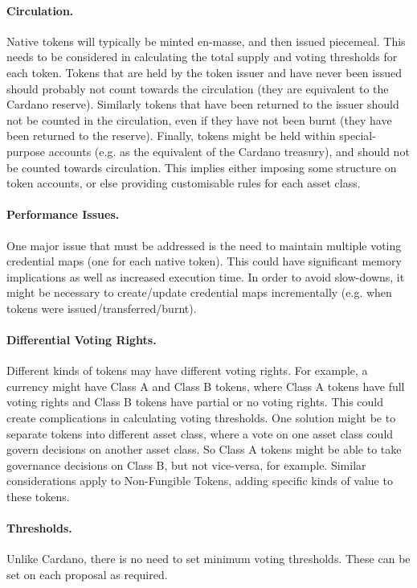\paragraph{Circulation.}
Native tokens will typically be minted en-masse, and then issued piecemeal.
This needs to be considered in calculating the total supply and voting
thresholds for each token.  Tokens that are held by the token issuer and have
never been issued should probably not count towards the circulation (they are
equivalent to the Cardano reserve).  Similarly tokens that have been returned to
the issuer should not be counted in the circulation, even if they have not been
burnt (they have been returned to the reserve).  Finally, tokens might be held
within special-purpose accounts (e.g. as the equivalent of the Cardano
treasury), and should not be counted towards circulation.  This implies either
imposing some structure on token accounts, or else providing customisable rules for
each asset class.

\paragraph{Performance Issues.}
One major issue that must be addressed is the need to maintain multiple voting
credential maps (one for each native token).  This could have significant memory
implications as well as increased execution time.  In order to avoid slow-downs,
it might be necessary to create/update credential maps incrementally (e.g. when
tokens were issued/transferred/burnt).

\paragraph{Differential  Voting Rights.}
Different kinds of tokens may have different voting rights.  For example, a
currency might have Class A and Class B tokens, where Class A tokens have full
voting rights and Class B tokens have partial or no voting rights.  This could
create complications in calculating voting thresholds.  One solution might be to
separate tokens into different asset class, where a vote on one asset class
could govern decisions on another asset class.  So Class A tokens might be able
to take governance decisions on Class B, but not vice-versa, for example.
Similar considerations apply to Non-Fungible Tokens, adding specific kinds of
value to these tokens.

\paragraph{Thresholds.}
Unlike Cardano, there is no need to set minimum voting thresholds.  These can be
set on each proposal as required.

